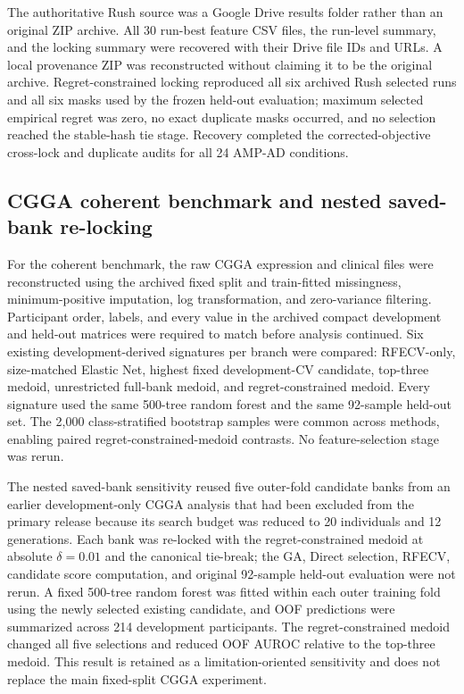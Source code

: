 The authoritative Rush source was a Google Drive results folder rather than an original ZIP archive. All 30 run-best feature CSV files, the run-level summary, and the locking summary were recovered with their Drive file IDs and URLs. A local provenance ZIP was reconstructed without claiming it to be the original archive. Regret-constrained locking reproduced all six archived Rush selected runs and all six masks used by the frozen held-out evaluation; maximum selected empirical regret was zero, no exact duplicate masks occurred, and no selection reached the stable-hash tie stage. Recovery completed the corrected-objective cross-lock and duplicate audits for all 24 AMP-AD conditions.

\subsection{CGGA coherent benchmark and nested saved-bank re-locking}

For the coherent benchmark, the raw CGGA expression and clinical files were reconstructed using the archived fixed split and train-fitted missingness, minimum-positive imputation, log transformation, and zero-variance filtering. Participant order, labels, and every value in the archived compact development and held-out matrices were required to match before analysis continued. Six existing development-derived signatures per branch were compared: RFECV-only, size-matched Elastic Net, highest fixed development-CV candidate, top-three medoid, unrestricted full-bank medoid, and regret-constrained medoid. Every signature used the same 500-tree random forest and the same 92-sample held-out set. The 2,000 class-stratified bootstrap samples were common across methods, enabling paired regret-constrained-medoid contrasts. No feature-selection stage was rerun.

The nested saved-bank sensitivity reused five outer-fold candidate banks from an earlier development-only CGGA analysis that had been excluded from the primary release because its search budget was reduced to 20 individuals and 12 generations. Each bank was re-locked with the regret-constrained medoid at absolute \(\delta=0.01\) and the canonical tie-break; the GA, Direct selection, RFECV, candidate score computation, and original 92-sample held-out evaluation were not rerun. A fixed 500-tree random forest was fitted within each outer training fold using the newly selected existing candidate, and OOF predictions were summarized across 214 development participants. The regret-constrained medoid changed all five selections and reduced OOF AUROC relative to the top-three medoid. This result is retained as a limitation-oriented sensitivity and does not replace the main fixed-split CGGA experiment.

